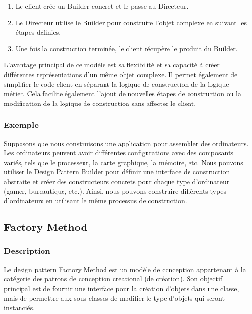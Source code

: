 \documentclass[french]{article}
\begin{document}
\begin{enumerate}
    \item Le client crée un Builder concret et le passe au Directeur.
    \item Le Directeur utilise le Builder pour construire l'objet complexe en suivant les étapes définies.
    \item Une fois la construction terminée, le client récupère le produit du Builder.
\end{enumerate}

L'avantage principal de ce modèle est sa flexibilité et sa capacité à créer différentes représentations d'un même objet complexe. Il permet également de simplifier le code client en séparant la logique de construction de la logique métier. Cela facilite également l'ajout de nouvelles étapes de construction ou la modification de la logique de construction sans affecter le client.


\subsubsection{Exemple}

Supposons que nous construisons une application pour assembler des ordinateurs. Les ordinateurs peuvent avoir différentes configurations avec des composants variés, tels que le processeur, la carte graphique, la mémoire, etc. Nous pouvons utiliser le Design Pattern Builder pour définir une interface de construction abstraite et créer des constructeurs concrets pour chaque type d'ordinateur (gamer, bureautique, etc.). Ainsi, nous pouvons construire différents types d'ordinateurs en utilisant le même processus de construction.




\newpage

\subsection{Factory Method}

\subsubsection{Description}

Le design pattern Factory Method est un modèle de conception appartenant à la catégorie des patrons de conception creational (de création). Son objectif principal est de fournir une interface pour la création d'objets dans une classe, mais de permettre aux sous-classes de modifier le type d'objets qui seront instanciés.
\end{document}
